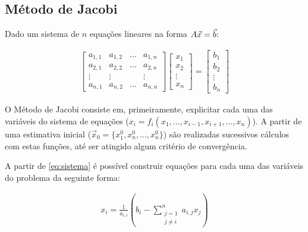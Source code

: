 \documentclass[final,5p]{elsarticle}
\numberwithin{equation}{section}
\begin{document}
    \subsection{Método de Jacobi}

        Dado um sistema de $n$ equações lineares na forma $\\A \vec{x} = \vec{b}$:

        \begin{align}
            \left[
                \begin{array}{cccc}
                    a_{1,1}    & a_{1,2}    & \ldots & a_{1,n} \\
                    a_{2,1}    & a_{2,2}    & \ldots & a_{2,n} \\
                    \vdots     & \vdots     &        & \vdots  \\
                    a_{n,1}    & a_{n,2}    & \ldots & a_{n,n}
                \end{array}
            \right]
            \begin{bmatrix}
                x_{1}  \\
                x_{2}  \\
                \vdots \\
                x_{n}
            \end{bmatrix}
            =
            \begin{bmatrix}
                b_{1}  \\
                b_{2}  \\
                \vdots \\
                b_{n}
            \end{bmatrix}
            \label{eq:sistema}
        \end{align}

        O Método de Jacobi consiste em, primeiramente, explicitar cada uma das variáveis do sistema de equações ($x_i = f_i(x_1,\ldots,x_{i-1},x_{i+1},\ldots,x_n)$). A partir de uma estimativa inicial ($\vec{x}_0 = \{x_1^0,x_n^0,\ldots,x_n^0\}$) são realizadas sucessivos cálculos com estas funções, até ser atingido algum critério de convergência\cite{burden2016analise}.

        A partir de \ref{eq:sistema} é possível construir equações para cada uma das variáveis do problema da seguinte forma:

        \begin{align}
            x_i = \frac{1}{a_{i,i}} ( b_i - \sum^{n}_{\substack{j=1 \\ j \neq i}} a_{i,j} x_j ) \label{eq:jacobi}
        \end{align}
\end{document}
